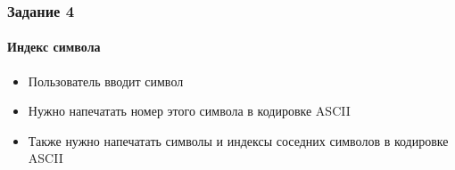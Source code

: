 \documentclass[12pt,pdf,hyperref={unicode}]{beamer}
\begin{document}
\begin{frame}
\frametitle{Задание 4} 
\framesubtitle{Индекс символа} 
\begin{center}
\begin{itemize}
\item Пользователь вводит символ\\
\item Нужно напечатать номер этого символа в кодировке ASCII\\
\item Также нужно напечатать символы и индексы соседних символов в кодировке ASCII \\
\end{itemize}
\end{center}
\end{frame}

\fi
\end{document}
